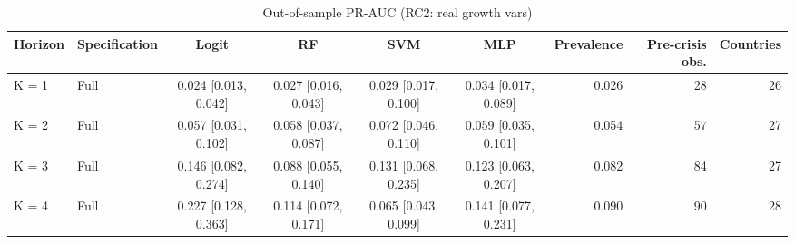 \begin{table}

\caption{\label{tab:pr_boot_rc2}Out-of-sample PR-AUC (RC2: real growth vars)}
\centering
\begin{tabular}[t]{llccccrrr}
\toprule
Horizon & Specification & Logit & RF & SVM & MLP & Prevalence & Pre-crisis obs. & Countries\\
\midrule
K = 1 & Full & 0.024 [0.013, 0.042] & 0.027 [0.016, 0.043] & 0.029 [0.017, 0.100] & 0.034 [0.017, 0.089] & 0.026 & 28 & 26\\
\cmidrule{1-9}
K = 2 & Full & 0.057 [0.031, 0.102] & 0.058 [0.037, 0.087] & 0.072 [0.046, 0.110] & 0.059 [0.035, 0.101] & 0.054 & 57 & 27\\
\cmidrule{1-9}
K = 3 & Full & 0.146 [0.082, 0.274] & 0.088 [0.055, 0.140] & 0.131 [0.068, 0.235] & 0.123 [0.063, 0.207] & 0.082 & 84 & 27\\
\cmidrule{1-9}
K = 4 & Full & 0.227 [0.128, 0.363] & 0.114 [0.072, 0.171] & 0.065 [0.043, 0.099] & 0.141 [0.077, 0.231] & 0.090 & 90 & 28\\
\bottomrule
\end{tabular}
\end{table}
